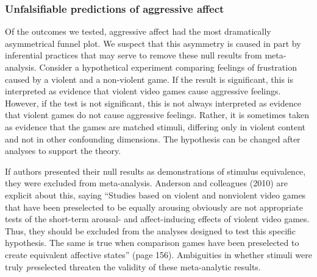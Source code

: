 \documentclass[man, mask]{apa6}
\begin{document}
\subsubsection{Unfalsifiable predictions of aggressive affect}
Of the outcomes we tested, aggressive affect had the most dramatically asymmetrical funnel plot. We suspect that this asymmetry is caused in part by inferential practices that may serve to remove these null results from meta-analysis. Consider a hypothetical experiment comparing feelings of frustration caused by a violent and a non-violent game. If the result is significant, this is interpreted as evidence that violent video games cause aggressive feelings. However, if the test is not significant, this is not always interpreted as evidence that violent games do not cause aggressive feelings. Rather, it is sometimes taken as evidence that the games are matched stimuli, differing only in violent content and not in other confounding dimensions. The hypothesis can be changed after analyses to support the theory.

If authors presented their null results as demonstrations of stimulus equivalence, they were excluded from meta-analysis. Anderson and colleagues (2010) are explicit about this, saying ``Studies based on violent and nonviolent video games that have been preselected to be equally arousing obviously are not appropriate tests of the short-term arousal- and affect-inducing effects of violent video games. Thus, they should be excluded from the analyses designed to test this specific hypothesis. The same is true when comparison games have been preselected to create equivalent affective states'' (page 156).  Ambiguities in whether stimuli were truly {\em pre}selected threaten the validity of these meta-analytic results.

\end{document}
